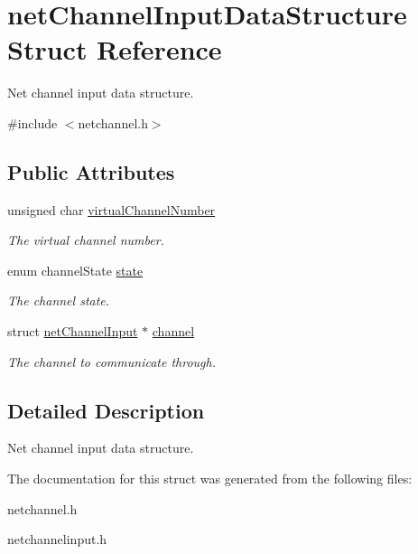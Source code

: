 \hypertarget{structnetChannelInputDataStructure}{\section{net\-Channel\-Input\-Data\-Structure Struct Reference}
\label{structnetChannelInputDataStructure}
}


Net channel input data structure.  




{\ttfamily \#include $<$netchannel.\-h$>$}

\subsection*{Public Attributes}
\begin{DoxyCompactItemize}
\item 
\hypertarget{structnetChannelInputDataStructure_a3782bafe16eecacb594da758e7d8b70f}{unsigned char \hyperlink{structnetChannelInputDataStructure_a3782bafe16eecacb594da758e7d8b70f}{virtual\-Channel\-Number}}\label{structnetChannelInputDataStructure_a3782bafe16eecacb594da758e7d8b70f}

\begin{DoxyCompactList}\small\item\em The virtual channel number. \end{DoxyCompactList}\item 
\hypertarget{structnetChannelInputDataStructure_a046979d7e1529ce7bc9c5d1032742635}{enum channel\-State \hyperlink{structnetChannelInputDataStructure_a046979d7e1529ce7bc9c5d1032742635}{state}}\label{structnetChannelInputDataStructure_a046979d7e1529ce7bc9c5d1032742635}

\begin{DoxyCompactList}\small\item\em The channel state. \end{DoxyCompactList}\item 
\hypertarget{structnetChannelInputDataStructure_aa5fa3ce8a850ff4bc923108fc1d4d1c0}{struct \hyperlink{structnetChannelInput}{net\-Channel\-Input} $\ast$ \hyperlink{structnetChannelInputDataStructure_aa5fa3ce8a850ff4bc923108fc1d4d1c0}{channel}}\label{structnetChannelInputDataStructure_aa5fa3ce8a850ff4bc923108fc1d4d1c0}

\begin{DoxyCompactList}\small\item\em The channel to communicate through. \end{DoxyCompactList}\end{DoxyCompactItemize}


\subsection{Detailed Description}
Net channel input data structure. 

The documentation for this struct was generated from the following files\-:\begin{DoxyCompactItemize}
\item 
netchannel.\-h\item 
netchannelinput.\-h\end{DoxyCompactItemize}
